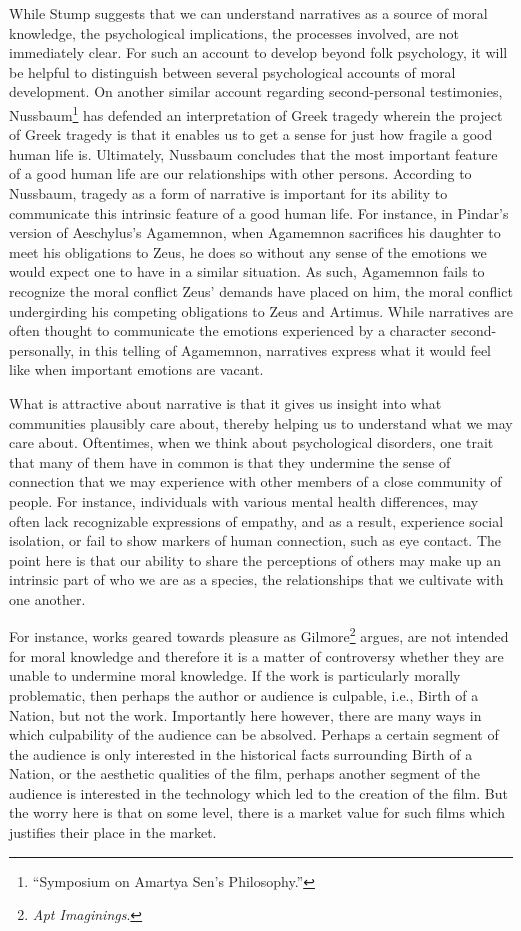 \documentclass[phdthesis,12pt,final]{wuthesis}
\theoremstyle{definition}
\theoremstyle{definition}
\theoremstyle{definition}
\theoremstyle{definition}
\theoremstyle{remark}
\begin{document}
While Stump suggests that we can understand narratives as a source of moral knowledge, the psychological implications, the processes involved, are not immediately clear. For such an account to develop beyond folk psychology, it will be helpful to distinguish between several psychological accounts of moral development. On another similar account regarding second-personal testimonies, Nussbaum\footnote{{``Symposium on {Amartya Sen}'s Philosophy.''}} has defended an interpretation of Greek tragedy wherein the project of Greek tragedy is that it enables us to get a sense for just how fragile a good human life is. Ultimately, Nussbaum concludes that the most important feature of a good human life are our relationships with other persons. According to Nussbaum, tragedy as a form of narrative is important for its ability to communicate this intrinsic feature of a good human life. For instance, in Pindar's version of Aeschylus's Agamemnon, when Agamemnon sacrifices his daughter to meet his obligations to Zeus, he does so without any sense of the emotions we would expect one to have in a similar situation. As such, Agamemnon fails to recognize the moral conflict Zeus' demands have placed on him, the moral conflict undergirding his competing obligations to Zeus and Artimus. While narratives are often thought to communicate the emotions experienced by a character second-personally, in this telling of Agamemnon, narratives express what it would feel like when important emotions are vacant.

What is attractive about narrative is that it gives us insight into what communities plausibly care about, thereby helping us to understand what we may care about. Oftentimes, when we think about psychological disorders, one trait that many of them have in common is that they undermine the sense of connection that we may experience with other members of a close community of people. For instance, individuals with various mental health differences, may often lack recognizable expressions of empathy, and as a result, experience social isolation, or fail to show markers of human connection, such as eye contact. The point here is that our ability to share the perceptions of others may make up an intrinsic part of who we are as a species, the relationships that we cultivate with one another.

For instance, works geared towards pleasure as Gilmore\footnote{\emph{Apt {Imaginings}}.} argues, are not intended for moral knowledge and therefore it is a matter of controversy whether they are unable to undermine moral knowledge. If the work is particularly morally problematic, then perhaps the author or audience is culpable, i.e., Birth of a Nation, but not the work. Importantly here however, there are many ways in which culpability of the audience can be absolved. Perhaps a certain segment of the audience is only interested in the historical facts surrounding Birth of a Nation, or the aesthetic qualities of the film, perhaps another segment of the audience is interested in the technology which led to the creation of the film. But the worry here is that on some level, there is a market value for such films which justifies their place in the market.
\end{document}
